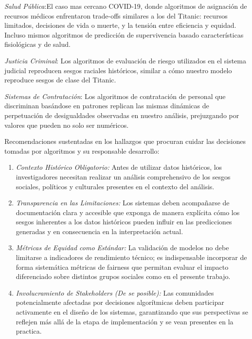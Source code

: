 \documentclass[conference]{IEEEtran}
\begin{document}
\emph{Salud Pública}:El caso mas cercano COVID-19, donde algoritmos de asignación de recursos médicos enfrentaron trade-offs similares a los del Titanic: recursos limitados, decisiones de vida o muerte, y la tensión entre eficiencia y equidad. Incluso mismos algoritmos de predicción de supervivencia basado características fisiológicas y de salud.

\emph{Justicia Criminal}: Los algoritmos de evaluación de riesgo utilizados en el sistema judicial reproducen sesgos raciales históricos, similar a cómo nuestro modelo reproduce sesgos de clase del Titanic.

\emph{Sistemas de Contratación}: Los algoritmos de contratación de personal que discriminan basándose en patrones replican las mismas dinámicas de perpetuación de desigualdades observadas en nuestro análisis, prejuzgando por valores que pueden no solo ser numéricos.

Recomendaciones sustentadas en los hallazgos que procuran cuidar las decisiones tomadas por algoritmos y su responsable desarrollo:
\begin{enumerate}
    \item \emph{Contexto Histórico Obligatorio:} Antes de utilizar datos históricos, los investigadores necesitan realizar un análisis comprehensivo de los sesgos sociales, políticos y culturales presentes en el contexto del análisis.
    
    \item \emph{Transparencia en las Limitaciones:} Los sistemas deben acompañarse de documentación clara y accesible que exponga de manera explícita cómo los sesgos inherentes a los datos históricos pueden influir en las predicciones generadas y en consecuencia en la interpretación actual.
    
    \item \emph{Métricas de Equidad como Estándar:} La validación de modelos no debe limitarse a indicadores de rendimiento técnico; es indispensable incorporar de forma sistemática métricas de fairness que permitan evaluar el impacto diferenciado sobre distintos grupos sociales como en el presente trabajo.
    
    \item \emph{Involucramiento de Stakeholders (De se posible):} Las comunidades potencialmente afectadas por decisiones algorítmicas deben participar activamente en el diseño de los sistemas, garantizando que sus perspectivas se reflejen más allá de la etapa de implementación y se vean presentes en la practica.
\end{enumerate}
\end{document}
